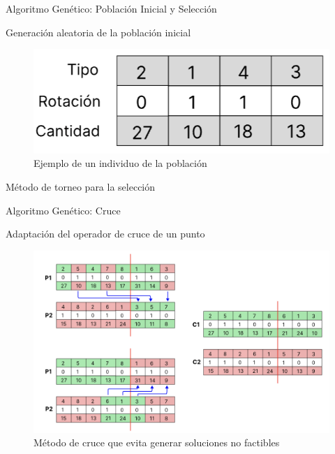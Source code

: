 \documentclass{beamer}
\begin{document}
\begin{frame}{Algoritmo Genético: Población Inicial y Selección}
    \begin{exampleblock}{Generación aleatoria de la población inicial}
        \vspace{1cm}
        \begin{figure}
            \centering
            \includegraphics[width=.5\textwidth]{pic/codificacion.png}
            \caption*{Ejemplo de un individuo de la población}
            \label{fig:individuo}
        \end{figure}
    \end{exampleblock}
    \begin{exampleblock}{Método de torneo para la selección}
    \end{exampleblock}
\end{frame}

\begin{frame}{Algoritmo Genético: Cruce}
    \begin{exampleblock}{Adaptación del operador de cruce de un punto}
        \begin{figure}
            \centering
            \includegraphics[width=.75\textwidth]{pic/ag-cruce.png}
            \caption*{Método de cruce que evita generar soluciones no factibles}
            \label{fig:solucion}
        \end{figure}
    \end{exampleblock}
\end{frame}
\end{document}
